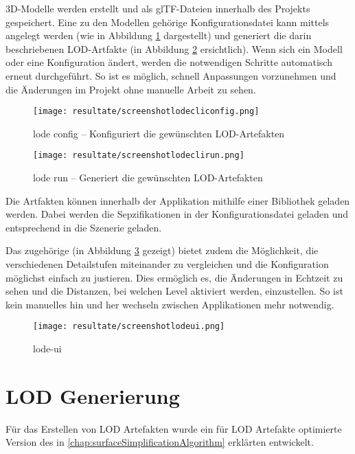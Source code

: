 3D-Modelle werden erstellt und als glTF-Dateien innerhalb des Projekts gespeichert. Eine zu den Modellen gehörige Konfigurationsdatei kann mittels  angelegt werden (wie in Abbildung \ref{fig:lodecliconfig} dargestellt) und  generiert die darin beschriebenen LOD-Artfakte (in Abbildung \ref{fig:lodeclirun} ersichtlich). Wenn sich ein Modell oder eine Konfiguration ändert, werden die notwendigen Schritte automatisch erneut durchgeführt. So ist es möglich, schnell Anpassungen vorzunehmen und die Änderungen im Projekt ohne manuelle Arbeit zu sehen.

\begin{figure}[H]
  \centering
  \texttt{[image: resultate/screenshotlodecliconfig.png]}
  \caption{lode  config – Konfiguriert die gewünschten LOD-Artefakten}
  \label{fig:lodecliconfig}
\end{figure}

\begin{figure}[H]
  \centering
  \texttt{[image: resultate/screenshotlodeclirun.png]}
  \caption{lode  run – Generiert die gewünschten LOD-Artefakten}
  \label{fig:lodeclirun}
\end{figure}

Die Artfakten können innerhalb der Applikation mithilfe einer Bibliothek geladen werden. Dabei werden die Sepzifikationen in der Konfigurationsdatei geladen und entsprechend in die Szenerie geladen.

Das zugehörige  (in Abbildung \ref{fig:lodeui} gezeigt) bietet zudem die Möglichkeit, die verschiedenen Detailstufen miteinander zu vergleichen und die Konfiguration möglichst einfach zu justieren. Dies ermöglich es, die Änderungen in Echtzeit zu sehen und die Distanzen, bei welchen Level aktiviert werden, einzustellen. So ist kein manuelles hin und her wechseln zwischen Applikationen mehr notwendig.

\begin{figure}[H]
  \centering
  \texttt{[image: resultate/screenshotlodeui.png]}
  \caption{lode-ui}
  \label{fig:lodeui}
\end{figure}

\section{LOD Generierung}

Für das Erstellen von LOD Artefakten wurde ein für LOD Artefakte optimierte Version des in \autoref{chap:surfaceSimplificationAlgorithm} erklärten  entwickelt.

